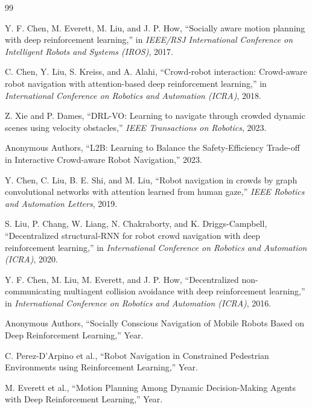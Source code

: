 \documentclass[11pt,a4paper]{article}
\begin{document}
\begin{thebibliography}{99}

Y. F. Chen, M. Everett, M. Liu, and J. P. How, ``Socially aware motion planning with deep reinforcement learning,'' in \textit{IEEE/RSJ International Conference on Intelligent Robots and Systems (IROS)}, 2017.

C. Chen, Y. Liu, S. Kreiss, and A. Alahi, ``Crowd-robot interaction: Crowd-aware robot navigation with attention-based deep reinforcement learning,'' in \textit{International Conference on Robotics and Automation (ICRA)}, 2018.

Z. Xie and P. Dames, ``DRL-VO: Learning to navigate through crowded dynamic scenes using velocity obstacles,'' \textit{IEEE Transactions on Robotics}, 2023.

Anonymous Authors, ``L2B: Learning to Balance the Safety-Efficiency Trade-off in Interactive Crowd-aware Robot Navigation,'' 2023.

Y. Chen, C. Liu, B. E. Shi, and M. Liu, ``Robot navigation in crowds by graph convolutional networks with attention learned from human gaze,'' \textit{IEEE Robotics and Automation Letters}, 2019.

S. Liu, P. Chang, W. Liang, N. Chakraborty, and K. Driggs-Campbell, ``Decentralized structural-RNN for robot crowd navigation with deep reinforcement learning,'' in \textit{International Conference on Robotics and Automation (ICRA)}, 2020.

Y. F. Chen, M. Liu, M. Everett, and J. P. How, ``Decentralized non-communicating multiagent collision avoidance with deep reinforcement learning,'' in \textit{International Conference on Robotics and Automation (ICRA)}, 2016.

Anonymous Authors, ``Socially Conscious Navigation of Mobile Robots Based on Deep Reinforcement Learning,'' Year.

C. Perez-D'Arpino et al., ``Robot Navigation in Constrained Pedestrian Environments using Reinforcement Learning,'' Year.

M. Everett et al., ``Motion Planning Among Dynamic Decision-Making Agents with Deep Reinforcement Learning,'' Year.


\end{thebibliography}
\end{document}
